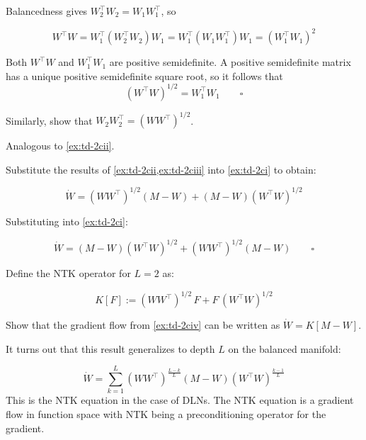 \documentclass[11pt]{article}
\begin{document}
\begin{solution}[ex:td-2cii]
Balancedness gives \(W_2^\top W_2 = W_1 W_1^\top\), so

\[W^\top W = W_1^\top \left(W_2^\top W_2\right) W_1 = W_1^\top \left(W_1 W_1^\top\right) W_1 = \left(W_1^\top W_1\right)^2\]

Both \(W^\top W\) and \(W_1^\top W_1\) are positive semidefinite.
A positive semidefinite matrix has a unique positive semidefinite square root, so it follows that
\[(W^\top W)^{1/2} = W_1^\top W_1 \qquad \square\]
\end{solution}

\begin{exercise}
\label{ex:td-2ciii}
Similarly, show that
\(W_2 W_2^\top = (W W^\top)^{1/2}\).
\end{exercise}

\begin{solution}[ex:td-2ciii]
Analogous to \cref{ex:td-2cii}.
\end{solution}

\begin{exercise}
\label{ex:td-2civ}
Substitute the results of \cref{ex:td-2cii,ex:td-2ciii} into \cref{ex:td-2ci}
to obtain:

\[\dot{W} = (W W^\top)^{1/2}(M - W) + (M - W)(W^\top W)^{1/2}\]
\end{exercise}

\begin{solution}[ex:td-2civ]
Substituting into \cref{ex:td-2ci}:

\[\dot{W} = (M - W)(W^\top W)^{1/2} + (WW^\top)^{1/2}(M - W) \qquad \square\]
\end{solution}

\begin{exercise}
\label{ex:td-2d}
Define the NTK operator for \(L = 2\) as:

\[K[F] := (WW^\top)^{1/2}\, F + F\, (W^\top W)^{1/2}\]

Show that the gradient flow from \cref{ex:td-2civ} can be written as
\(\dot{W} = K[M - W]\).

It turns out that this result generalizes to depth \(L\) on the balanced
manifold:

\[\dot{W} = \sum_{k=1}^{L} (WW^\top)^{\frac{L-k}{L}} (M - W) (W^\top W)^{\frac{k-1}{L}}\]
This is the NTK equation in the case of DLNs. The NTK equation is a gradient flow in function space with NTK being a preconditioning operator for the gradient.
\end{exercise}
\end{document}
